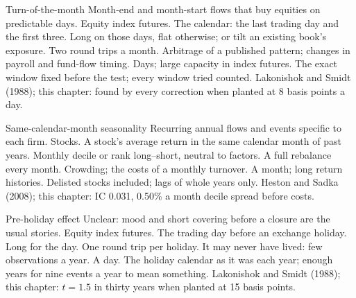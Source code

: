 \begin{strategyfile}{Turn-of-the-month}\label{strat:s1:seasonality-and-calendar-effects:tom}
 Month-end and month-start flows that buy equities on predictable days.
 Equity index futures.
 The calendar: the last trading day and the first three.
 Long on those days, flat otherwise; or tilt an existing book's exposure.
 Two round trips a month.
 Arbitrage of a published pattern; changes in payroll and fund-flow timing.
 Days; large capacity in index futures.
 The exact window fixed before the test; every window tried counted.
 Lakonishok and Smidt (1988); this chapter: found by every correction when planted at 8 basis points a day.
\end{strategyfile}

\begin{strategyfile}{Same-calendar-month seasonality}\label{strat:s1:seasonality-and-calendar-effects:samemonth}
 Recurring annual flows and events specific to each firm.
 Stocks.
 A stock's average return in the same calendar month of past years.
 Monthly decile or rank long--short, neutral to factors.
 A full rebalance every month.
 Crowding; the costs of a monthly turnover.
 A month; long return histories.
 Delisted stocks included; lags of whole years only.
 Heston and Sadka (2008); this chapter: IC 0.031, 0.50\% a month decile spread before costs.
\end{strategyfile}

\begin{strategyfile}{Pre-holiday effect}\label{strat:s1:seasonality-and-calendar-effects:holiday}
 Unclear: mood and short covering before a closure are the usual stories.
 Equity index futures.
 The trading day before an exchange holiday.
 Long for the day.
 One round trip per holiday.
 It may never have lived: few observations a year.
 A day.
 The holiday calendar as it was each year; enough years for nine events a year to mean something.
 Lakonishok and Smidt (1988); this chapter: $t = 1.5$ in thirty years when planted at 15 basis points.
\end{strategyfile}

